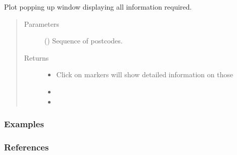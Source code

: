 \documentclass[letterpaper,10pt,english]{sphinxmanual}
\begin{document}
\begin{fulllineitems}
\label{\detokenize{index:flood_tool.plot_popping}}
\sphinxAtStartPar
Plot popping up window displaying all information required.
\begin{quote}\begin{description}
\item[{Parameters}] \leavevmode
\sphinxAtStartPar
{} () \textendash{} Sequence of postcodes.

\item[{Returns}] \leavevmode
\sphinxAtStartPar
\begin{itemize}
\item {} 
\sphinxAtStartPar
{} \textendash{} Click on markers will show detailed information on those

\item {} 
\sphinxAtStartPar
{}

\item {} 
\sphinxAtStartPar
{}

\end{itemize}


\end{description}\end{quote}
\subsubsection*{Examples}

\begin{sphinxVerbatim}[commandchars=\\\{\}]
\PYG{p}{[} \PYG{p}{]}
\end{sphinxVerbatim}

\end{fulllineitems}

\subsubsection*{References}


\renewcommand{\indexname}{Python Module Index}
\begin{sphinxtheindex}
\let\bigletter\sphinxstyleindexlettergroup
\bigletter{f}
\item\relax{}
\end{sphinxtheindex}

\renewcommand{\indexname}{Index}
\printindex
\end{document}
